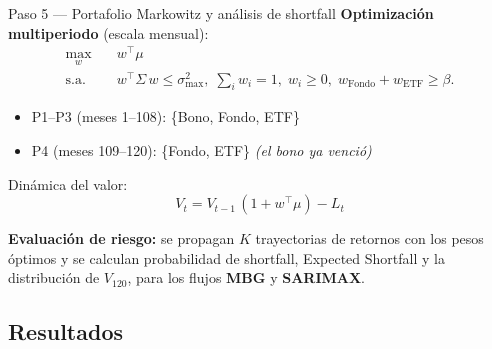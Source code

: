 \documentclass[10pt]{beamer}
\begin{document}
\begin{frame}{Paso 5 — Portafolio Markowitz y análisis de shortfall}
\small
\textbf{Optimización multiperiodo} (escala mensual):
\begin{equation*}
\begin{aligned}
\max_{w}\quad & w^\top\mu \\
\text{s.a.}\quad
& w^\top\Sigma\,w \le \sigma_{\max}^2,\;
\sum_i w_i = 1,\; w_i\ge 0,\;
w_{\text{Fondo}}+w_{\text{ETF}}\ge\beta.
\end{aligned}
\end{equation*}

\begin{itemize}
    \item P1--P3 (meses 1--108): \{Bono, Fondo, ETF\}
    \item P4 (meses 109--120): \{Fondo, ETF\} \quad\textit{(el bono ya venció)}
\end{itemize}

Dinámica del valor:
\[
V_t = V_{t-1}\,(1+w^\top\mu) - L_t
\]

\vspace{0.1cm}
\textbf{Evaluación de riesgo:} se propagan \(K\) trayectorias de retornos con los pesos óptimos
y se calculan probabilidad de shortfall, Expected Shortfall y la distribución de \(V_{120}\),
para los flujos \textbf{MBG} y \textbf{SARIMAX}.
\end{frame}

\subsection{Resultados}
\end{document}
